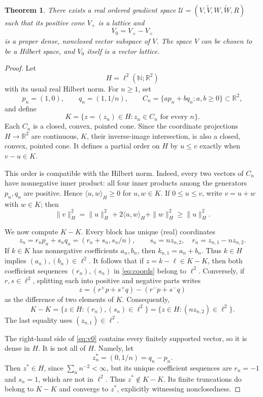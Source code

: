 \documentclass[11pt]{article}
\newtheorem{theorem}{Theorem}
\newcommand{\R}{\mathbb R}
\newcommand{\elltwo}{\ell^2}
\begin{document}
\begin{theorem}\label{thm:main}
There exists a real ordered gradient space
\(\mathcal U=(V,\widetilde V,W,\widetilde W,R)\) such that its positive
cone \(V_+\) is a lattice and
\[
 V_0=V_+-V_+
\]
is a proper dense, nonclosed vector subspace of \(V\).  The space \(V\) can
be chosen to be a Hilbert space, and \(V_0\) itself is a vector lattice.
\end{theorem}

\begin{proof}
Let
\[
 H=\elltwo(\mathbb N;\R^2)
\]
with its usual real Hilbert norm.  For \(n\ge1\), set
\[
 p_n=(1,0),\qquad q_n=(1,1/n),\qquad
 C_n=\{a p_n+bq_n:a,b\ge0\}\subset\R^2,
\]
and define
\[
 K=\{z=(z_n)\in H:z_n\in C_n\text{ for every }n\}.
\]
Each \(C_n\) is a closed, convex, pointed cone.  Since the coordinate
projections \(H\to\R^2\) are continuous, \(K\), their inverse-image
intersection, is also a closed, convex, pointed cone.  It defines a partial
order on \(H\) by \(u\le v\) exactly when \(v-u\in K\).

This order is compatible with the Hilbert norm.  Indeed, every two vectors
of \(C_n\) have nonnegative inner product: all four inner products among
the generators \(p_n,q_n\) are positive.  Hence
\(\langle u,w\rangle_H\ge0\) for \(u,w\in K\).  If \(0\le u\le v\), write
\(v=u+w\) with \(w\in K\); then
\[
 \|v\|_H^2=\|u\|_H^2+2\langle u,w\rangle_H+\|w\|_H^2
 \ge \|u\|_H^2.
\]

We now compute \(K-K\).  Every block has unique (real) coordinates
\begin{equation}\label{eq:coords}
 z_n=r_np_n+s_nq_n=(r_n+s_n,s_n/n),
 \qquad s_n=nz_{n,2},\quad r_n=z_{n,1}-nz_{n,2}.
\end{equation}
If \(k\in K\) has nonnegative coefficients \(a_n,b_n\), then
\(k_{n,1}=a_n+b_n\).  Thus \(k\in H\) implies
\((a_n),(b_n)\in\elltwo\).  It follows that if \(z=k-\ell\in K-K\), then
both coefficient sequences \((r_n),(s_n)\) in \eqref{eq:coords} belong to
\(\elltwo\).  Conversely, if \(r,s\in\elltwo\), splitting each into
positive and negative parts writes
\[
 z=(r^+p+s^+q)-(r^-p+s^-q)
\]
as the difference of two elements of \(K\).  Consequently,
\begin{equation}\label{eq:v0}
 K-K=\{z\in H:(r_n),(s_n)\in\elltwo\}
     =\{z\in H:(nz_{n,2})\in\elltwo\}.
\end{equation}
The last equality uses \((z_{n,1})\in\elltwo\).

The right-hand side of \eqref{eq:v0} contains every finitely supported
vector, so it is dense in \(H\).  It is not all of \(H\).  Namely, let
\[
 z^*_n=(0,1/n)=q_n-p_n.
\]
Then \(z^*\in H\), since \(\sum_n n^{-2}<\infty\), but its unique
coefficient sequences are \(r_n=-1\) and \(s_n=1\), which are not in
\(\elltwo\).  Thus \(z^*\notin K-K\).  Its finite truncations do belong to
\(K-K\) and converge to \(z^*\), explicitly witnessing nonclosedness.


\end{proof}
\end{document}
